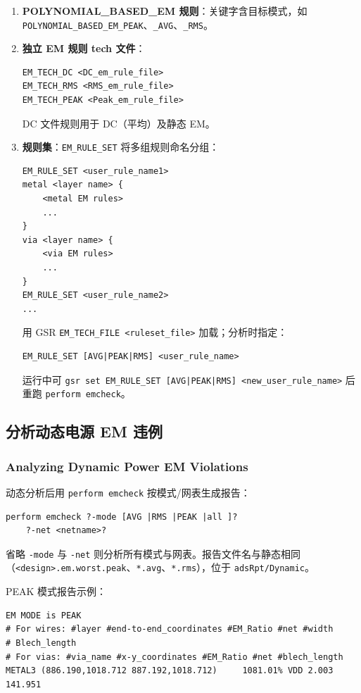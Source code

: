 \begin{enumerate}
  \item \textbf{POLYNOMIAL\_BASED\_EM 规则}：关键字含目标模式，如 \texttt{POLYNOMIAL\_BASED\_EM\_PEAK}、\texttt{\_AVG}、\texttt{\_RMS}。
  \item \textbf{独立 EM 规则 tech 文件}：
\begin{lstlisting}
EM_TECH_DC <DC_em_rule_file>
EM_TECH_RMS <RMS_em_rule_file>
EM_TECH_PEAK <Peak_em_rule_file>
\end{lstlisting}
  DC 文件规则用于 DC（平均）及静态 EM。
  \item \textbf{规则集}：\texttt{EM\_RULE\_SET} 将多组规则命名分组：
\begin{lstlisting}
EM_RULE_SET <user_rule_name1>
metal <layer name> {
    <metal EM rules>
    ...
}
via <layer name> {
    <via EM rules>
    ...
}
EM_RULE_SET <user_rule_name2>
...
\end{lstlisting}
  用 GSR \texttt{EM\_TECH\_FILE <ruleset\_file>} 加载；分析时指定：
\begin{lstlisting}
EM_RULE_SET [AVG|PEAK|RMS] <user_rule_name>
\end{lstlisting}
  运行中可 \texttt{gsr set EM\_RULE\_SET [AVG|PEAK|RMS] <new\_user\_rule\_name>} 后重跑 \texttt{perform emcheck}。
\end{enumerate}

\subsection{分析动态电源 EM 违例}
\subsubsection*{Analyzing Dynamic Power EM Violations}

动态分析后用 \texttt{perform emcheck} 按模式/网表生成报告：
\begin{lstlisting}
perform emcheck ?-mode [AVG |RMS |PEAK |all ]?
    ?-net <netname>?
\end{lstlisting}

省略 \texttt{-mode} 与 \texttt{-net} 则分析所有模式与网表。报告文件名与静态相同（\texttt{<design>.em.worst.peak}、\texttt{*.avg}、\texttt{*.rms}），位于 \texttt{adsRpt/Dynamic}。

PEAK 模式报告示例：
\begin{lstlisting}
EM MODE is PEAK
# For wires: #layer #end-to-end_coordinates #EM_Ratio #net #width
# Blech_length
# For vias: #via_name #x-y_coordinates #EM_Ratio #net #blech_length
METAL3 (886.190,1018.712 887.192,1018.712)     1081.01% VDD 2.003 141.951
\end{lstlisting}

